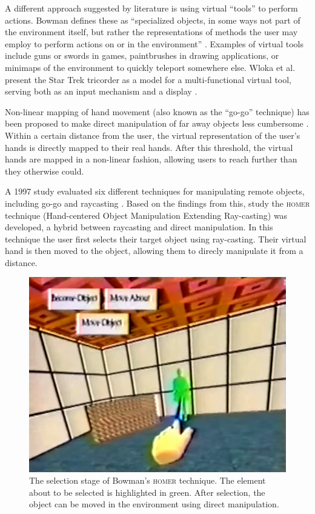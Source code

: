 \documentclass[nobib]{tufte-book} %
\begin{document}
A different approach suggested by literature is using virtual ``tools'' to perform actions. Bowman defines these as ``specialized objects, in some ways not part of the environment itself, but rather the representations of methods the user may employ to perform actions on or in the environment'' \cite{bowman1995user}. Examples of virtual tools include guns or swords in games, paintbrushes in drawing applications, or minimaps of the environment to quickly teleport somewhere else. Wloka et al. present the Star Trek tricorder as a model for a multi-functional virtual tool, serving both as an input mechanism and a display \cite{wloka1995virtual}.

\newpage

Non-linear mapping of hand movement (also known as the ``go-go'' technique) has been proposed to make direct manipulation of far away objects less cumbersome \cite{poupyrev1996go}. Within a certain distance from the user, the virtual representation of the user's hands is directly mapped to their real hands. After this threshold, the virtual hands are mapped in a non-linear fashion, allowing users to reach further than they otherwise could.

A 1997 study evaluated six different techniques for manipulating remote objects, including go-go and raycasting \cite{bowman1997evaluation}. Based on the findings from this, study the \textsc{homer} technique (Hand-centered Object Manipulation Extending Ray-casting) was developed, a hybrid between raycasting and direct manipulation. In this technique the user first selects their target object using ray-casting. Their virtual hand is then moved to the object, allowing them to direcly manipulate it from a distance.

\begin{figure}
  \includegraphics{homer.png}
  \caption{The selection stage of Bowman's \textsc{homer} technique. The element about to be selected is highlighted in green. After selection, the object can be moved in the environment using direct manipulation.}
  \label{fig:homer}
\end{figure}
\end{document}
